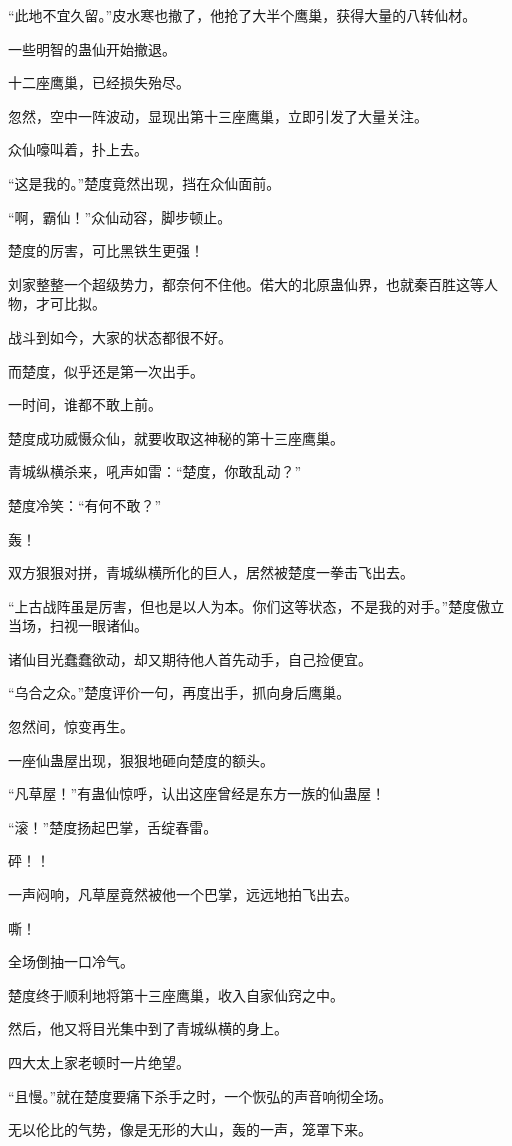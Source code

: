 \begin{this_body}
“此地不宜久留。”皮水寒也撤了，他抢了大半个鹰巢，获得大量的八转仙材。

一些明智的蛊仙开始撤退。

十二座鹰巢，已经损失殆尽。

忽然，空中一阵波动，显现出第十三座鹰巢，立即引发了大量关注。

众仙嚎叫着，扑上去。

“这是我的。”楚度竟然出现，挡在众仙面前。

“啊，霸仙！”众仙动容，脚步顿止。

楚度的厉害，可比黑铁生更强！

刘家整整一个超级势力，都奈何不住他。偌大的北原蛊仙界，也就秦百胜这等人物，才可比拟。

战斗到如今，大家的状态都很不好。

而楚度，似乎还是第一次出手。

一时间，谁都不敢上前。

楚度成功威慑众仙，就要收取这神秘的第十三座鹰巢。

青城纵横杀来，吼声如雷：“楚度，你敢乱动？”

楚度冷笑：“有何不敢？”

轰！

双方狠狠对拼，青城纵横所化的巨人，居然被楚度一拳击飞出去。

“上古战阵虽是厉害，但也是以人为本。你们这等状态，不是我的对手。”楚度傲立当场，扫视一眼诸仙。

诸仙目光蠢蠢欲动，却又期待他人首先动手，自己捡便宜。

“乌合之众。”楚度评价一句，再度出手，抓向身后鹰巢。

忽然间，惊变再生。

一座仙蛊屋出现，狠狠地砸向楚度的额头。

“凡草屋！”有蛊仙惊呼，认出这座曾经是东方一族的仙蛊屋！

“滚！”楚度扬起巴掌，舌绽春雷。

砰！！

一声闷响，凡草屋竟然被他一个巴掌，远远地拍飞出去。

嘶！

全场倒抽一口冷气。

楚度终于顺利地将第十三座鹰巢，收入自家仙窍之中。

然后，他又将目光集中到了青城纵横的身上。

四大太上家老顿时一片绝望。

“且慢。”就在楚度要痛下杀手之时，一个恢弘的声音响彻全场。

无以伦比的气势，像是无形的大山，轰的一声，笼罩下来。


\end{this_body}
